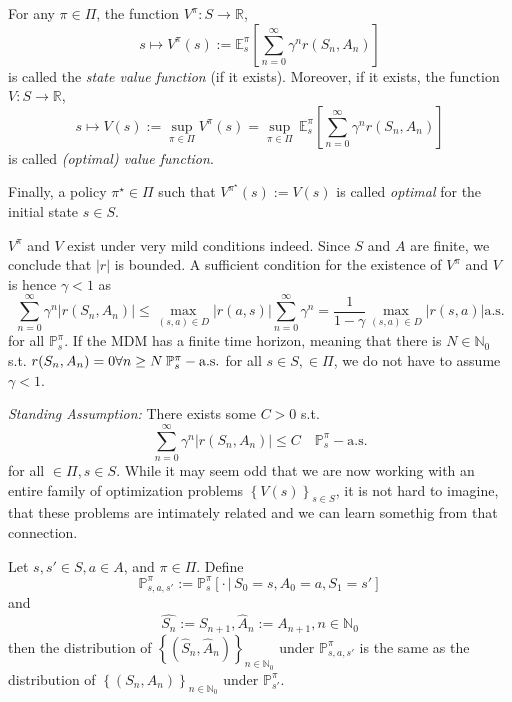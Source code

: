 \begin{definition}[\( V^\pi \qquad V\) ]
    For any \( \pi \in \Pi \), the function \( V^\pi: S \to \mathbb{R} \),
    \[ s \mapsto V^\pi(s) := \mathbb{E}_s^\pi\left[ \sum_{n=0}^{\infty}\gamma^n r(S_n, A_n) \right] \]
    is called the \emph{state value function} (if it exists).
    Moreover, if it exists, the function \( V: S \to \mathbb{R} \), 
    \[
        s \mapsto V(s) := \sup_{\pi \in \Pi} V^\pi (s) = \sup_{\pi \in \Pi}\, \mathbb{E}_{s}^{\pi}\left[ \sum_{n=0}^{\infty} \gamma^n r(S_n, A_n) \right]
    \] 
    is called \emph{(optimal) value function}.

    Finally, a policy \( \pi^\star \in \Pi \) such that \( V^{\pi^\star}(s) := V(s) \) is called \emph{optimal} for the initial state \( s \in S \). 

\end{definition}

\begin{remark}
    \( V^\pi \) and \( V \) exist under very mild conditions indeed. Since \( S \) and \( A \) are finite, we conclude that \( |r| \) is bounded. A sufficient condition for the existence of \( V^\pi \) and \( V \) is hence \( \gamma < 1  \) as 
    \[
        \sum_{n=0}^{\infty} \gamma^n | r(S_n, A_n)| \leq \max_{(s,a) \in D} | r(a,s) | \sum_{n=0}^{\infty} \gamma^n = \frac{1}{1-\gamma} \max_{(s,a) \in D} |r(s,a)| \text{a.s.}
    \]        
    for all \( \mathbb{P}_s^\pi \). If the MDM has a finite time horizon, meaning that there is \( N \in \mathbb{N}_{0} \) s.t. \( r(S_n, A_n) = 0 \forall n \geq N\:  \mathbb{P}_s^\pi-\text{a.s.}\) for all \( s \in S,  \in \Pi \), we do not have to assume \( \gamma < 1 \).

\end{remark}

\emph{Standing Assumption:} There exists some \( C > 0 \) s.t. 
\[
    \sum_{n=0}^{\infty} \gamma^n | r(S_n, A_n)| \leq C\quad  \mathbb{P}_s^\pi-\text{a.s.}
\] 
for all \(  \in \Pi, s \in S\). 
While it may seem odd that we are now working with an entire family of optimization problems \( \left\{ V(s) \right\}_{s \in S} \), it is not hard to imagine, that these problems are intimately related and we can learn somethig from that connection.

\begin{lemma}
    \label{time_shift_lemma}
    Let \( s,s' \in S, a \in A \), and \( \pi \in \Pi \).
    Define 
    \[
        \mathbb{P}_{s,a,s'}^\pi := \mathbb{P}_s^\pi[ \cdot \,|\, S_{0} = s, A_{0} = a, S_{1} = s']
    \] 
    and 
    \[
        \hat{S_n} := S_{n+1}, \hat{A}_n := A_{n+1}, n \in \mathbb{N}_{0}
    \]
    then the distribution of \( \left\{ (\hat{S}_n, \hat{A}_n) \right\}_{n \in \mathbb{N}_{0}} \) under \( \mathbb{P}_{s,a,s'}^\pi \) is the same as the distribution of 
    \( \left\{ (S_n, A_n) \right\}_{n \in \mathbb{N}_{0}} \) under \( \mathbb{P}_{s'}^\pi \).    
\end{lemma}

